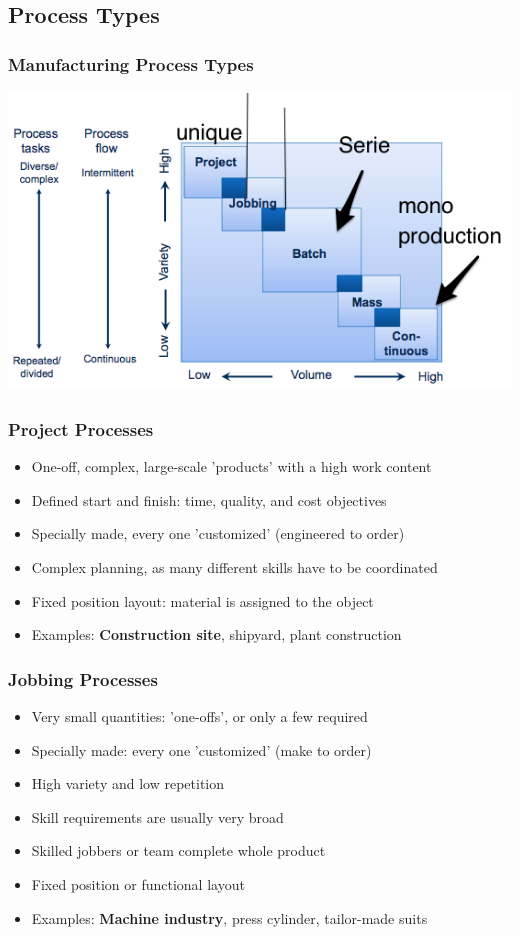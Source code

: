 \subsection{Process Types}
\subsubsection{Manufacturing Process Types}

\includegraphics[width=1\textwidth]{W04/manufacturingprocesstype}
\subsubsection{Project Processes }
\begin{itemize}
\item One-off, complex, large-scale 'products' with a
high work content
\item Defined start and finish: time, quality, and cost
objectives
\item Specially made, every one 'customized'
(engineered to order)
\item Complex planning, as many different skills have
to be coordinated
\item Fixed position layout: material is assigned to the
object
\item Examples: \textbf{Construction site}, shipyard, plant
construction
\end{itemize}
\subsubsection{Jobbing Processes}
\begin{itemize}
\item Very small quantities: 'one-offs', or only a few
required
\item Specially made: every one 'customized'
(make to order)
\item High variety and low repetition
\item Skill requirements are usually very broad
\item Skilled jobbers or team complete whole
product
\item Fixed position or functional layout
\item Examples: \textbf{Machine industry}, press cylinder,
tailor-made suits
\end{itemize}
